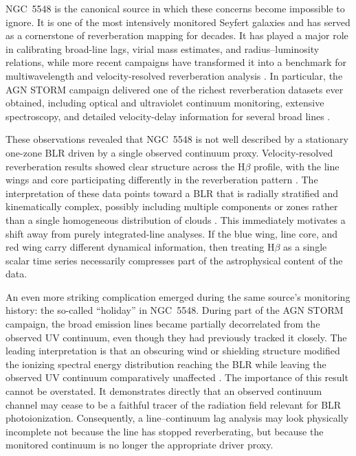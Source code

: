\documentclass[12pt, a4paper]{article}
\begin{document}
NGC~5548 is the canonical source in which these concerns become impossible to ignore. It is one of the most intensively monitored Seyfert galaxies and has served as a cornerstone of reverberation mapping for decades. It has played a major role in calibrating broad-line lags, virial mass estimates, and radius--luminosity relations, while more recent campaigns have transformed it into a benchmark for multiwavelength and velocity-resolved reverberation analysis \cite{Peterson2002,BentzKatz2015,Cackett2021}. In particular, the AGN STORM campaign delivered one of the richest reverberation datasets ever obtained, including optical and ultraviolet continuum monitoring, extensive spectroscopy, and detailed velocity-delay information for several broad lines \cite{DeRosa2015,Pei2017,Horne2021}.

These observations revealed that NGC~5548 is not well described by a stationary one-zone BLR driven by a single observed continuum proxy. Velocity-resolved reverberation results showed clear structure across the H$\beta$ profile, with the line wings and core participating differently in the reverberation pattern \cite{Pei2017,Horne2021}. The interpretation of these data points toward a BLR that is radially stratified and kinematically complex, possibly including multiple components or zones rather than a single homogeneous distribution of clouds \cite{Horne2021,LongDexter2025}. This immediately motivates a shift away from purely integrated-line analyses. If the blue wing, line core, and red wing carry different dynamical information, then treating H$\beta$ as a single scalar time series necessarily compresses part of the astrophysical content of the data.

An even more striking complication emerged during the same source's monitoring history: the so-called ``holiday'' in NGC~5548. During part of the AGN STORM campaign, the broad emission lines became partially decorrelated from the observed UV continuum, even though they had previously tracked it closely. The leading interpretation is that an obscuring wind or shielding structure modified the ionizing spectral energy distribution reaching the BLR while leaving the observed UV continuum comparatively unaffected \cite{Dehghanian2019}. The importance of this result cannot be overstated. It demonstrates directly that an observed continuum channel may cease to be a faithful tracer of the radiation field relevant for BLR photoionization. Consequently, a line--continuum lag analysis may look physically incomplete not because the line has stopped reverberating, but because the monitored continuum is no longer the appropriate driver proxy.
\end{document}
